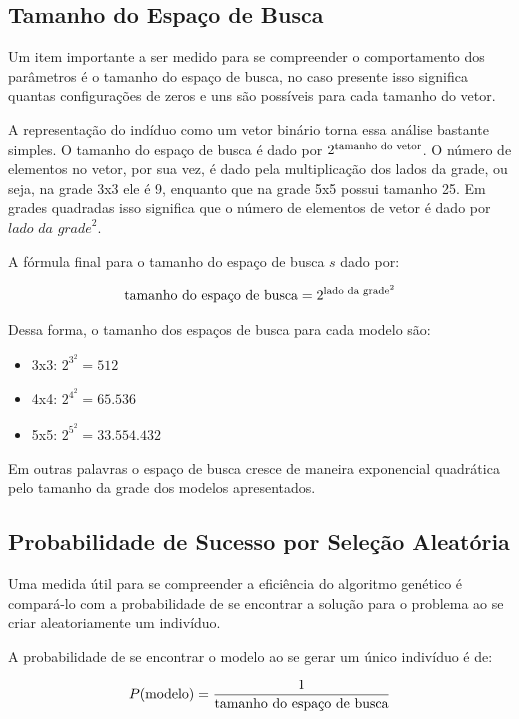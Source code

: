 \documentclass{llncs}
\begin{document}
\subsection{Tamanho do Espaço de Busca}
%
Um item importante a ser medido para se compreender o comportamento dos parâmetros é o tamanho do espaço de busca, no caso presente isso significa quantas configurações de zeros e uns são possíveis para cada tamanho do vetor.

A representação do indíduo como um vetor binário torna essa análise bastante simples. O tamanho do espaço de busca é dado por $2^{\textnormal{tamanho do vetor}}$. O número de elementos no vetor, por sua vez, é dado pela multiplicação dos lados da grade, ou seja, na grade 3x3 ele é 9, enquanto que na grade 5x5 possui tamanho 25. Em grades quadradas isso significa que o número de elementos de vetor é dado por $\textit{lado da grade}^2$.

A fórmula final para o tamanho do espaço de busca $s$ dado por:

\begin{align*}
\textnormal{tamanho do espaço de busca} = 2^{\textnormal{lado da grade}^2}
\end{align*}

Dessa forma, o tamanho dos espaços de busca para cada modelo são:

\begin{itemize}
\item 3x3: $2^{3^2} = 512$
\item 4x4: $2^{4^2} = 65.536$
\item 5x5: $2^{5^2} = 33.554.432$
\end{itemize}

Em outras palavras o espaço de busca cresce de maneira exponencial quadrática pelo tamanho da grade dos modelos apresentados.

%
\subsection{Probabilidade de Sucesso por Seleção Aleatória}
%
Uma medida útil para se compreender a eficiência do algoritmo genético é compará-lo com a probabilidade de se encontrar a solução para o problema ao se criar aleatoriamente um indivíduo.

A probabilidade de se encontrar o modelo ao se gerar um único indivíduo é de:

\begin{align*}
P(\textnormal{modelo}) = \frac{1}{\textnormal{tamanho do espaço de busca}}
\end{align*}
\end{document}

